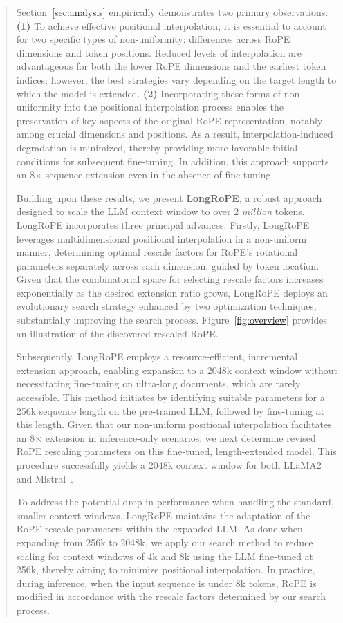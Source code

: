 \begin{abstract}
Section~\ref{sec:analysis} empirically demonstrates two primary observations: \textbf{(1)} To achieve effective positional interpolation, it is essential to account for two specific types of non-uniformity: differences across RoPE dimensions and token positions. Reduced levels of interpolation are advantageous for both the lower RoPE dimensions and the earliest token indices; however, the best strategies vary depending on the target length to which the model is extended. 
\textbf{(2)} Incorporating these forms of non-uniformity into the positional interpolation process enables the preservation of key aspects of the original RoPE representation, notably among crucial dimensions and positions. As a result, interpolation-induced degradation is minimized, thereby providing more favorable initial conditions for subsequent fine-tuning. In addition, this approach supports an 8$\times$ sequence extension even in the absence of fine-tuning.

Building upon these results, we present \textbf{LongRoPE}, a robust approach designed to scale the LLM context window to over 2 \emph{million} tokens. LongRoPE incorporates three principal advances. Firstly, LongRoPE leverages multidimensional positional interpolation in a non-uniform manner, determining optimal rescale factors for RoPE's rotational parameters separately across each dimension, guided by token location. Given that the combinatorial space for selecting rescale factors increases exponentially as the desired extension ratio grows, LongRoPE deploys an evolutionary search strategy enhanced by two optimization techniques, substantially improving the search process. Figure~\ref{fig:overview} provides an illustration of the discovered rescaled RoPE.

Subsequently, {LongRoPE} employs a resource-efficient, incremental extension approach, enabling expansion to a 2048k context window without necessitating fine-tuning on ultra-long documents, which are rarely accessible. This method initiates by identifying suitable parameters for a 256k sequence length on the pre-trained LLM, followed by fine-tuning at this length. Given that our non-uniform positional interpolation facilitates an 8$\times$ extension in inference-only scenarios, we next determine revised RoPE rescaling parameters on this fine-tuned, length-extended model. This procedure successfully yields a 2048k context window for both LLaMA2 and Mistral~\cite{mistral}.

To address the potential drop in performance when handling the standard, smaller context windows, {LongRoPE} maintains the adaptation of the RoPE rescale parameters within the expanded LLM. As done when expanding from 256k to 2048k, we apply our search method to reduce scaling for context windows of 4k and 8k using the LLM fine-tuned at 256k, thereby aiming to minimize positional interpolation. In practice, during inference, when the input sequence is under 8k tokens, RoPE is modified in accordance with the rescale factors determined by our search process.


\end{abstract}
